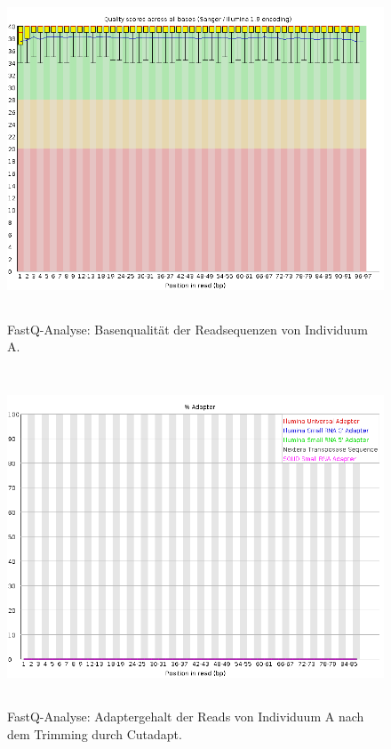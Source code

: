 \begin{figure}[H]
	\begin{center}
		\includegraphics[height=10cm]{bilder/evaluation/fastq/per_base_quality.png}
		\caption{FastQ-Analyse: Basenqualität der Readsequenzen von Individuum A.}
		\label{fig:basequal}
	\end{center}
\end{figure}
\vspace{-2cm}
\begin{figure}[H]
	\begin{center}
		\includegraphics[height=10cm]{bilder/evaluation/fastq/adapter_content.png}
		\caption{FastQ-Analyse: Adaptergehalt der Reads von Individuum A nach dem Trimming durch Cutadapt.}
		\label{fig:adapt}
	\end{center}
\end{figure}


